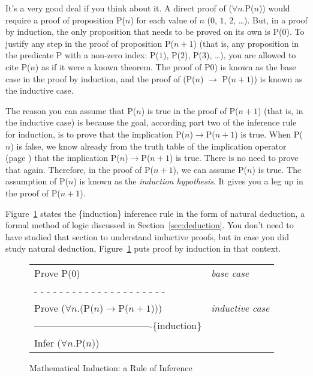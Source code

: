It's a very good deal if you think about it.
A direct proof of ($\forall$$n$.P($n$)) would require a proof of proposition P($n$)
for each value of $n$ ($0$, $1$, $2$, \dots).
But, in a proof by induction,
the only proposition that needs to be proved on its own is P($0$).
To justify any step in the proof of proposition P($n+1$)
(that is, any proposition in the predicate P with a non-zero index:
P($1$), P($2$), P($3$), \dots),
you are allowed to cite P($n$) as if it were a known theorem.
The proof of P$0$) is known as the base case in the proof by induction,
and the proof of (P($n$) $\rightarrow$ P($n+1$)) is known as the inductive case.

The reason you can assume that P($n$) is true in the proof of P($n+1$)
(that is, in the inductive case)
is because the goal, according part two of the inference rule
for induction, is to prove that the implication
P($n$)$\rightarrow$P($n+1$) is true.
When P($n$) is false, we know already from the truth table
of the implication operator (page \pageref{implication-truth-table})
that the implication P($n$)$\rightarrow$P($n+1$) is true.
There is no need to prove that again.
Therefore, in the proof of P($n+1$), we can assume P($n$) is true.
The assumption of P($n$) is known as the
\emph{induction hypothesis}.
It gives you a leg up in the proof of P($n+1$).

Figure~\ref{induction-rule} states the \{induction\} inference rule
in the form of natural deduction, a formal method of logic discussed
in Section~\ref{sec:deduction}. You don't need to have studied that
section to understand inductive proofs, but in case you did study
natural deduction, Figure~\ref{induction-rule} puts proof by
induction in that context.

\begin{figure}
\begin{center}
\begin{tabular}{ll}
Prove P(0)                                         &\emph{base case}\\
 - - - - - - - - - - - - - - - - - - - - -         &\\
Prove ($\forall$$n$.(P($n$)$\rightarrow$P($n+1$))) &\emph{inductive case}\\
-------------------------------------\{induction\} &\\
Infer ($\forall$$n$.P($n$))                        &\\
\end{tabular}
\end{center}
\caption{Mathematical Induction: a Rule of Inference}
\label{fig-04-01}
\label{induction-rule}
\end{figure}

